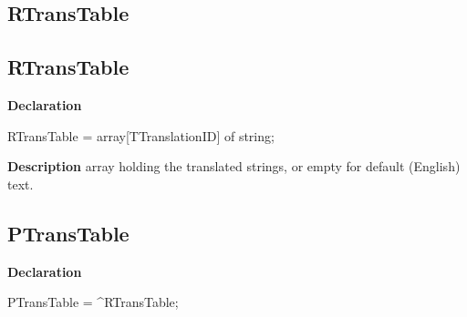 \documentclass{report}
\newif\ifpdf
\begin{document}
\subsection*{\large{\textbf{RTransTable}}\normalsize\hspace{1ex}\hrulefill}
\else
\subsection*{RTransTable}
\fi
\label{PasDoc_Languages-RTransTable}
\begin{list}{}{
\setlength{\itemindent}{0cm}
\setlength{\listparindent}{0cm}
\setlength{\leftmargin}{\evensidemargin}
\addtolength{\leftmargin}{\tmplength}
\settowidth{\labelsep}{X}
\addtolength{\leftmargin}{\labelsep}
\setlength{\labelwidth}{\tmplength}
}
\item[\textbf{Declaration}\hfill]
\ifpdf
\begin{flushleft}
\fi
\begin{ttfamily}
RTransTable = array[TTranslationID] of string;\end{ttfamily}

\ifpdf
\end{flushleft}
\fi

\par
\item[\textbf{Description}]
array holding the translated strings, or empty for default (English) text.

\end{list}
\ifpdf
\subsection*{\large{\textbf{PTransTable}}\normalsize\hspace{1ex}\hrulefill}
\else
\subsection*{PTransTable}
\fi
\label{PasDoc_Languages-PTransTable}
\begin{list}{}{
\setlength{\itemindent}{0cm}
\setlength{\listparindent}{0cm}
\setlength{\leftmargin}{\evensidemargin}
\addtolength{\leftmargin}{\tmplength}
\settowidth{\labelsep}{X}
\addtolength{\leftmargin}{\labelsep}
\setlength{\labelwidth}{\tmplength}
}
\item[\textbf{Declaration}\hfill]
\ifpdf
\begin{flushleft}
\fi
\begin{ttfamily}
PTransTable = {\^{}}RTransTable;\end{ttfamily}

\ifpdf
\end{flushleft}
\fi

\end{list}
\ifpdf
\end{document}
